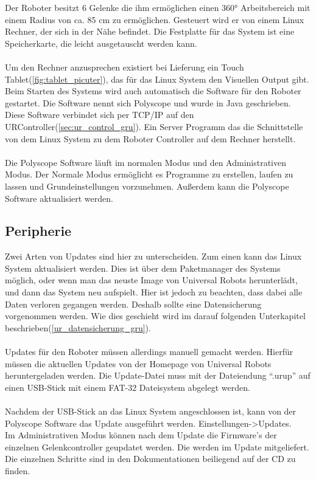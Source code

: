 Der Roboter besitzt 6 Gelenke die ihm ermöglichen einen 360° Arbeitsbereich mit einem Radius von ca. 85 cm zu ermöglichen. Gesteuert wird er von einem Linux Rechner, der sich in der Nähe befindet.
Die Festplatte für das System ist eine Speicherkarte, die leicht ausgetauscht werden kann.
\\\\
Um den Rechner anzusprechen existiert bei Lieferung ein Touch Tablet(\ref{fig:tablet_picuter}), das für das Linux System den Visuellen Output gibt. Beim Starten des Systems wird auch automatisch die Software für den Roboter gestartet. Die Software nennt sich Polyscope und wurde in Java geschrieben. Diese Software verbindet sich per \ac{TCP/IP} auf den URController(\ref{sec:ur_control_gru}). Ein Server Programm das die Schnittstelle von dem Linux System zu dem Roboter Controller auf dem Rechner herstellt.
\\\\
Die Polyscope Software läuft im normalen Modus und den Administrativen Modus. Der Normale Modus ermöglicht es Programme zu erstellen, laufen zu lassen und Grundeinstellungen vorzunehmen. Außerdem kann die Polyscope Software aktualisiert werden.

\subsection{Peripherie}
\label{sub:ur_update_gru}

Zwei Arten von Updates sind hier zu unterscheiden. Zum einen kann das Linux System aktualisiert werden. Dies ist über dem Paketmanager des Systems möglich, oder wenn man das neuste Image von Universal Robots herunterlädt, und dann das System neu aufspielt. Hier ist jedoch zu beachten, dass dabei alle Daten verloren gegangen werden. Deshalb sollte eine Datensicherung vorgenommen werden. Wie dies geschieht wird im darauf folgenden Unterkapitel beschrieben(\ref{ur_datensicherung_gru}).
\\\\
Updates für den Roboter müssen allerdings manuell gemacht werden. Hierfür müssen die aktuellen Updates von der Homepage von Universal Robots heruntergeladen werden. Die Update-Datei muss mit der Dateiendung ``.urup'' auf einen USB-Stick mit einem FAT-32 Dateisystem abgelegt werden.\\\\
Nachdem der USB-Stick an das Linux System angeschlossen ist, kann von der Polyscope Software das Update ausgeführt werden. Einstellungen->Updates.\\
Im Administrativen Modus können nach dem Update die Firmware's der einzelnen Gelenkcontroller geupdatet werden. Die werden im Update mitgeliefert. Die einzelnen Schritte sind in den Dokumentationen beiliegend auf der CD zu finden.

